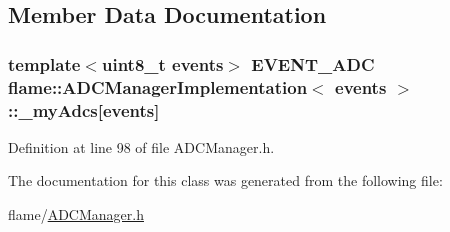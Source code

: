 \subsection{Member Data Documentation}
\hypertarget{classflame_1_1_a_d_c_manager_implementation_aab124e6a32ba437c772a7c43492ed4af}{
\subsubsection[{\-\_\-my\-Adcs}]{\setlength{\rightskip}{0pt plus 5cm}template$<$uint8\-\_\-t events$>$ {\bf E\-V\-E\-N\-T\-\_\-\-A\-D\-C} {\bf flame\-::\-A\-D\-C\-Manager\-Implementation}$<$ events $>$\-::\-\_\-my\-Adcs\mbox{[}events\mbox{]}\hspace{0.3cm}{\ttfamily [protected]}}}\label{classflame_1_1_a_d_c_manager_implementation_aab124e6a32ba437c772a7c43492ed4af}


Definition at line 98 of file A\-D\-C\-Manager.\-h.



The documentation for this class was generated from the following file\-:\begin{DoxyCompactItemize}
\item 
flame/\hyperlink{_a_d_c_manager_8h}{A\-D\-C\-Manager.\-h}\end{DoxyCompactItemize}
